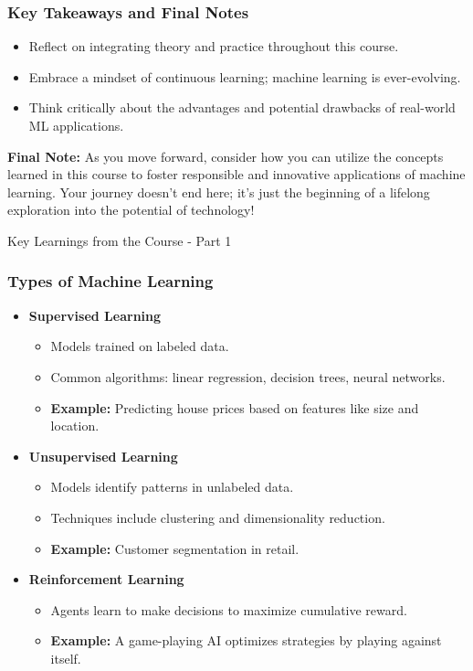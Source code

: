 \documentclass[aspectratio=169]{beamer}
\begin{document}
\begin{frame}[fragile]
    \frametitle{Key Takeaways and Final Notes}
    \begin{itemize}
        \item Reflect on integrating theory and practice throughout this course.
        \item Embrace a mindset of continuous learning; machine learning is ever-evolving.
        \item Think critically about the advantages and potential drawbacks of real-world ML applications.
    \end{itemize}
    
    \textbf{Final Note:} As you move forward, consider how you can utilize the concepts learned in this course to foster responsible and innovative applications of machine learning. Your journey doesn’t end here; it’s just the beginning of a lifelong exploration into the potential of technology!
\end{frame}

\begin{frame}[fragile]{Key Learnings from the Course - Part 1}
    \frametitle{Types of Machine Learning}
    \begin{itemize}
        \item \textbf{Supervised Learning}
        \begin{itemize}
            \item Models trained on labeled data.
            \item Common algorithms: linear regression, decision trees, neural networks.
            \item \textbf{Example:} Predicting house prices based on features like size and location.
        \end{itemize}
        
        \item \textbf{Unsupervised Learning}
        \begin{itemize}
            \item Models identify patterns in unlabeled data.
            \item Techniques include clustering and dimensionality reduction.
            \item \textbf{Example:} Customer segmentation in retail.
        \end{itemize}
        
        \item \textbf{Reinforcement Learning}
        \begin{itemize}
            \item Agents learn to make decisions to maximize cumulative reward.
            \item \textbf{Example:} A game-playing AI optimizes strategies by playing against itself.
        \end{itemize}
    \end{itemize}
\end{frame}
\end{document}
